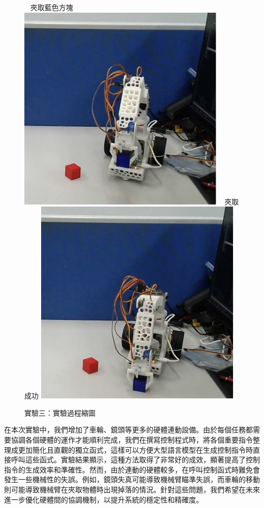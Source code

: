 \documentclass[class=NCU_thesis, crop=false]{standalone}
\begin{document}
\begin{figure}[h]
    ~    
    \subcaptionbox
        {夾取藍色方塊
        \label{fig:fig-dataset-contrast-after-adjustment}}
        {\includegraphics[width=0.4\linewidth]{figures/Exp3 (6)_square.jpg}}
    ~
    \subcaptionbox
        {夾取成功
        \label{fig:fig-dataset-contrast-after-adjustment}}
        {\includegraphics[width=0.4\linewidth]{figures/Exp3 (7)_square.jpg}}   
\caption{實驗三：實驗過程縮圖}
\end{figure}

在本次實驗中，我們增加了車輪、鏡頭等更多的硬體連動設備。由於每個任務都需要協調各個硬體的運作才能順利完成，我們在撰寫控制程式時，將各個重要指令整理成更加簡化且直觀的獨立函式，這樣可以方便大型語言模型在生成控制指令時直接呼叫這些函式。實驗結果顯示，這種方法取得了非常好的成效，顯著提高了控制指令的生成效率和準確性。然而，由於連動的硬體較多，在呼叫控制函式時難免會發生一些機械性的失誤。例如，鏡頭失真可能導致機械臂瞄準失誤，而車輪的移動則可能導致機械臂在夾取物體時出現掉落的情況。針對這些問題，我們希望在未來進一步優化硬體間的協調機制，以提升系統的穩定性和精確度。
\end{document}
